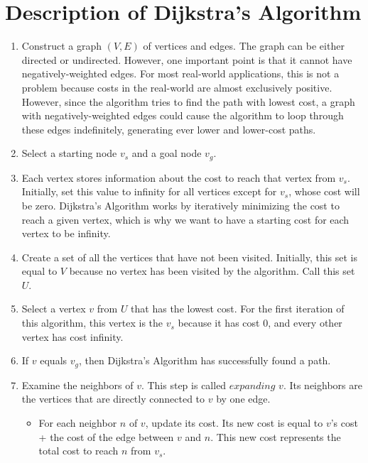 \documentclass[conference]{IEEEtran}
\begin{document}
\section{Description of Dijkstra's Algorithm}
\begin{enumerate}
    \item Construct a graph $(V, E)$ of vertices and edges. The graph can be either directed or undirected. However, one important point is that it cannot have negatively-weighted edges. For most real-world applications, this is not a problem because costs in the real-world are almost exclusively positive. However, since the algorithm tries to find the path with lowest cost, a graph with negatively-weighted edges could cause the algorithm to loop through these edges indefinitely, generating ever lower and lower-cost paths.

    \item Select a starting node $v_s$ and a goal node $v_g$.

    \item Each vertex stores information about the cost to reach that vertex from $v_s$. Initially, set this value to infinity for all vertices except for $v_s$, whose cost will be zero. Dijkstra's Algorithm works by iteratively minimizing the cost to reach a given vertex, which is why we want to have a starting cost for each vertex to be infinity.

    \item Create a set of all the vertices that have not been visited. Initially, this set is equal to $V$ because no vertex has been visited by the algorithm. Call this set $U$.

    \item Select a vertex $v$ from $U$ that has the lowest cost. For the first iteration of this algorithm, this vertex is the $v_s$ because it has cost 0, and every other vertex has cost infinity.

    \item If $v$ equals $v_g$, then Dijkstra’s Algorithm has successfully found a path.

    \item Examine the neighbors of $v$. This step is called $expanding$ $v$. Its neighbors are the vertices that are directly connected to $v$ by one edge.

    \begin{itemize}
        \item For each neighbor $n$ of $v$, update its cost. Its new cost is equal to $v$’s cost + the cost of the edge between $v$ and $n$. This new cost represents the total cost to reach $n$ from $v_s$.


\end{itemize}
\end{enumerate}
\end{document}
